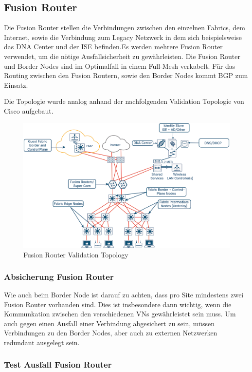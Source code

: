 \subsection{Fusion Router}
Die Fusion Router stellen die Verbindungen zwischen den einzelnen Fabrics, dem Internet, sowie die Verbindung zum Legacy Netzwerk in dem sich beispielsweise das DNA Center und der ISE befinden.Es werden mehrere Fusion Router verwendet, um die nötige Ausfallsicherheit zu gewährleisten. Die Fusion Router und Border Nodes sind im Optimalfall in einem Full-Mesh verkabelt. Für das Routing zwischen den Fusion Routern, sowie den Border Nodes kommt BGP zum Einsatz.

Die Topologie wurde analog anhand der nachfolgenden Validation Topologie von Cisco aufgebaut.
\begin{figure}[H]
	\centering
	\includegraphics[width=1\linewidth]{img/Absicherung/FusionRouter-ValidationTopology}
	\caption{Fusion Router Validation Topology \cite{sda-deploymentguide-oct2018} }
	\label{fig:Fusion Router Validation Topology}
\end{figure}

\subsubsection{Absicherung Fusion Router}
Wie auch beim Border Node ist darauf zu achten, dass pro Site mindestens zwei Fusion Router vorhanden sind. Dies ist insbesondere dann wichtig, wenn die Kommunkation zwischen den verschiedenen VNs gewährleistet sein muss. Um auch gegen einen Ausfall einer Verbindung abgesichert zu sein, müssen Verbindungen zu den Border Nodes, aber auch zu externen Netzwerken redundant ausgelegt sein.

\subsubsection{Test Ausfall Fusion Router}

